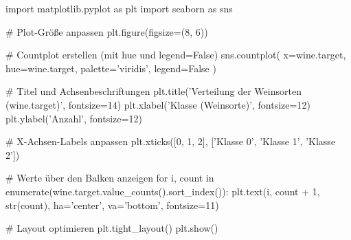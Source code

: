 import matplotlib.pyplot as plt
import seaborn as sns

# Plot-Größe anpassen
plt.figure(figsize=(8, 6))

# Countplot erstellen (mit hue und legend=False)
sns.countplot(
    x=wine.target,
    hue=wine.target,
    palette='viridis',
    legend=False
)

# Titel und Achsenbeschriftungen
plt.title('Verteilung der Weinsorten (wine.target)', fontsize=14)
plt.xlabel('Klasse (Weinsorte)', fontsize=12)
plt.ylabel('Anzahl', fontsize=12)

# X-Achsen-Labels anpassen
plt.xticks([0, 1, 2], ['Klasse 0', 'Klasse 1', 'Klasse 2'])

# Werte über den Balken anzeigen
for i, count in enumerate(wine.target.value_counts().sort_index()):
    plt.text(i, count + 1, str(count), ha='center', va='bottom', fontsize=11)

# Layout optimieren
plt.tight_layout()
plt.show()